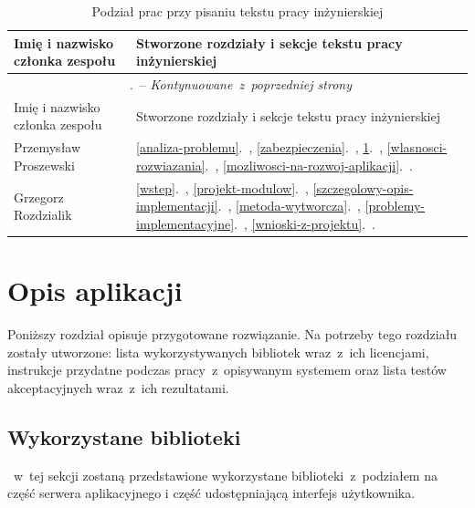 \documentclass[a4paper,11pt,twoside]{report}
\renewcommand*{\thetable}{\arabic{chapter}.\arabic{table}}
\theoremstyle{definition}
\begin{document}
    \begin{longtable}{| p{} | p{} |}
        \caption{Podział prac przy pisaniu tekstu pracy inżynierskiej}
        \label{podzial-prac-tekst-pracy} \\
        \hline
        Imię i nazwisko członka zespołu & Stworzone rozdziały i sekcje tekstu pracy inżynierskiej \\ \hline
        \endfirsthead
        \multicolumn{2}{c}{\tablename\ \thetable\ -- \textit{Kontynuowane~z~poprzedniej strony}} \\
        \hline
        Imię i nazwisko członka zespołu & Stworzone rozdziały i sekcje tekstu pracy inżynierskiej \\ \hline
        \endhead
        
        Przemysław Proszewski &
        \ref{analiza-problemu}.~\nameref{analiza-problemu},
        \ref{zabezpieczenia}.~\nameref{zabezpieczenia},
        \ref{opis-aplikacji}.~\nameref{opis-aplikacji},
        \ref{wlasnosci-rozwiazania}.~\nameref{wlasnosci-rozwiazania},
        \ref{mozliwosci-na-rozwoj-aplikacji}.~\nameref{mozliwosci-na-rozwoj-aplikacji}. \\ \hline
        
        Grzegorz Rozdzialik &
        \ref{wstep}.~\nameref{wstep},
        \ref{projekt-modulow}.~\nameref{projekt-modulow},
        \ref{szczegolowy-opis-implementacji}.~\nameref{szczegolowy-opis-implementacji},
        \ref{metoda-wytworcza}.~\nameref{metoda-wytworcza},
        \ref{problemy-implementacyjne}.~\nameref{problemy-implementacyjne},
        \ref{wnioski-z-projektu}.~\nameref{wnioski-z-projektu}. \\ \hline
    \end{longtable}

\chapter{Opis aplikacji}
    \label{opis-aplikacji}
    Poniższy rozdział opisuje przygotowane rozwiązanie. Na potrzeby tego rozdziału zostały utworzone: lista wykorzystywanych bibliotek wraz~z~ich licencjami, instrukcje przydatne podczas pracy~z~opisywanym systemem oraz lista testów akceptacyjnych wraz~z~ich rezultatami.
    
    \section{Wykorzystane biblioteki}
        ~w~tej sekcji zostaną przedstawione wykorzystane biblioteki~z~podziałem na część serwera aplikacyjnego i część udostępniającą interfejs użytkownika.
        
\end{document}
